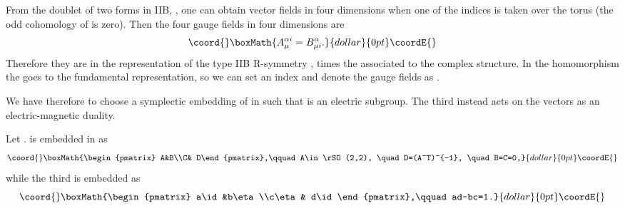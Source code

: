 \documentclass[a4paper,12pt]{article}
\begin{document}
\bigskip

From the doublet of two forms in IIB, \coordHE{}, one can
obtain vector fields in four dimensions when one of the indices is
taken over the torus \coordHE{} (the odd cohomology of \myHighlight{$\K$}\coordHE{} is zero).
Then the four gauge fields  in four dimensions are \cite{tt}
$$\coord{}\boxMath{A_\mu^{\alpha i}= B_{\mu i}^\alpha.}{dollar}{0pt}\coordE{}$$
Therefore they are in the  representation  \coordHE{} of the type IIB R-symmetry \coordHE{}, times
the \coordHE{} associated to the \coordHE{} complex structure. In
the homomorphism \coordHE{} the
\coordHE{} goes to the fundamental representation,
so we can set an index \coordHE{} and denote the
gauge fields as \coordHE{}.


We have therefore to choose a symplectic embedding of \coordHE{} in \coordHE{} such that \coordHE{} is an
electric subgroup. The third \coordHE{} instead acts on the
vectors as an electric-magnetic duality.

Let \coordHE{}. \coordHE{} is embedded in
\coordHE{} as
$$\coord{}\boxMath{\begin{pmatrix}
A&B\\C& D\end{pmatrix},\qquad A\in \rSO(2,2), \quad D=(A^T)^{-1},
\quad B=C=0,}{dollar}{0pt}\coordE{}$$ while the  third  \coordHE{} is embedded as
$$\coord{}\boxMath{\begin{pmatrix}
a\id&b\eta\\c\eta& d\id\end{pmatrix},\qquad ad-bc=1.}{dollar}{0pt}\coordE{}$$
\end{document}
